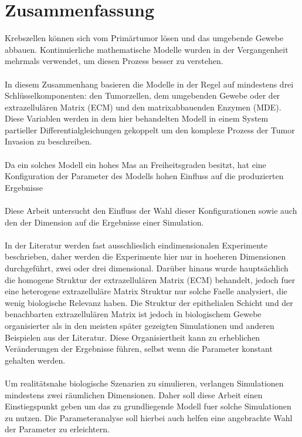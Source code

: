 \section*{Zusammenfassung}

Krebszellen können sich vom Primärtumor lösen und das umgebende Gewebe abbauen. 
Kontinuierliche mathematische Modelle wurden in der Vergangenheit mehrmals verwendet, um diesen Prozess besser zu verstehen. \\ \\
In diesem Zusammenhang basieren die Modelle in der Regel auf mindestens drei Schlüsselkomponenten: den Tumorzellen, dem umgebenden Gewebe oder der extrazellulären Matrix (ECM) und den matrixabbauenden Enzymen (MDE). Diese Variablen werden in dem hier behandelten Modell in einem System partieller Differentialgleichungen gekoppelt um den komplexe Prozess der Tumor Invasion zu beschreiben. \\ \\
Da ein solches Modell ein hohes Mas an Freiheitsgraden besitzt, hat eine Konfiguration der Parameter des Modells hohen Einfluss auf die produzierten Ergebnisse \\ \\
Diese Arbeit untersucht den Einfluss der Wahl dieser Konfigurationen sowie auch den der Dimension auf die Ergebnisse einer Simulation. \\ \\ 
In der Literatur werden fast ausschlieslich eindimensionalen Experimente beschrieben, daher werden die Experimente hier nur in hoeheren Dimensionen durchgeführt, zwei oder drei dimensional. Darüber hinaus wurde hauptsächlich die homogene Struktur der extrazellulären Matrix (ECM) behandelt, jedoch fuer eine heterogene extrazelluläre Matrix Struktur nur solche Faelle analysiert, die wenig biologische Relevanz haben. Die Struktur der epithelialen Schicht und der benachbarten extrazellulären Matrix ist jedoch in biologischem Gewebe organisierter als in den meisten später gezeigten Simulationen und anderen Beispielen aus der Literatur. Diese Organisiertheit kann zu erheblichen Veränderungen der Ergebnisse führen, selbst wenn die Parameter konstant gehalten werden.\\ \\
Um realitätsnahe biologische Szenarien zu simulieren, verlangen Simulationen mindestens zwei räumlichen Dimensionen. Daher soll diese Arbeit einen Einstiegspunkt geben um das zu grundliegende Modell fuer solche Simulationen zu nutzen. Die Parameteranalyse soll hierbei auch helfen eine angebrachte Wahl der Parameter zu erleichtern.

